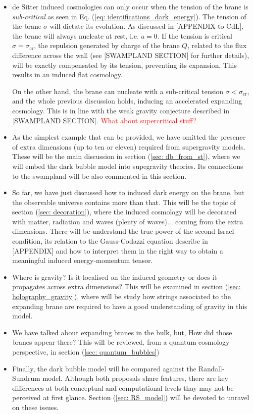 \documentclass[12pt, a4paper]{article} %
\begin{document}
\begin{itemize}
	\item de Sitter induced cosmologies can only occur when the tension of the brane is \textit{sub-critical} as seen in Eq. (\ref{eq: identifications_dark_energy}). The tension of the brane $\sigma$ will dictate its evolution. As discussed in [APPENDIX to CdL], the brane will always nucleate at rest, i.e. $\dot{a} = 0$. If the tension is critical $\sigma = \sigma_{\text{cr}}$, the repulsion generated by charge of the brane $Q$, related to the flux difference across the wall (see [SWAMPLAND SECTION] for further details), will be exactly compensated by its tension, preventing its expansion. This results in an induced flat cosmology.
	
	On the other hand, the brane can nucleate with a sub-critical tension $\sigma < \sigma_{\text{cr}}$, and the whole previous discussion holds, inducing an accelerated expanding cosmology. This is in line with the weak gravity conjecture described in [SWAMPLAND SECTION]. \textcolor{red}{What about supercritical stuff?}

	\item As the simplest example that can be provided, we have omitted the presence of extra dimensions (up to ten or eleven) required from supergravity models. These will be the main discussion in section (\ref{sec: db_from_st}), where we will embed the dark bubble model into supegravity theories. Its connections to the swampland will be also commented in this section.

	\item So far, we have just discussed how to induced dark energy on the brane, but the observable universe contains more than that. This will be the topic of section (\ref{sec: decoration}), where the induced cosmology will be decorated with matter, radiation and waves (plenty of waves)... coming from the extra dimensions. There will be understand the true power of the second Israel condition, its relation to the Gauss-Codazzi equation describe in [APPENDIX] and how to interpret them in the right way to obtain a meaningful induced energy-momentum tensor.
	
	\item Where is gravity? Is it localised on the induced geometry or does it propagates across extra dimensions? This will be examined in section (\ref{sec: holography_gravity}), where will be study how strings associated to the expanding brane are required to have a good understanding of gravity in this model.
	
	\item We have talked about expanding branes in the bulk, but, How did those branes appear there? This will be reviewed, from a quantum cosmology perspective, in section (\ref{sec: quantum_bubbles})
	
	\item Finally, the dark bubble model will be compared against the Randall-Sundrum model. Although both proposals share features, there are key differences at both conceptual and computational levels thay may not be perceived at first glance. Section (\ref{sec: RS_model}) will be devoted to unravel on these issues.
\end{itemize}
\end{document}
